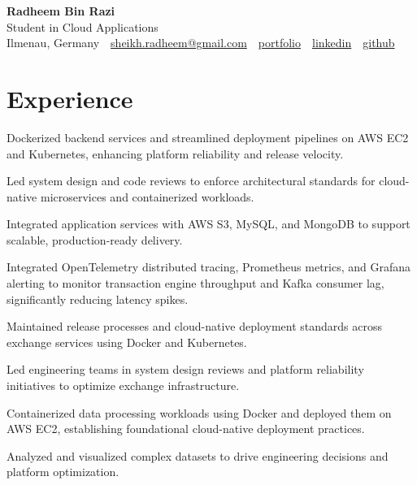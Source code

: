 \documentclass[10pt,a4paper]{resume}
\makeatletter
\newcommand{\Portfolio}{https://radheem.github.io/my-cv}
\newcommand{\PortfolioText}{portfolio}
\newcommand{\GitHub}{https://github.com/radheem}
\newcommand{\LinkedIn}{https://www.linkedin.com/in/radheem-razi}
\newcommand{\Email}{sheikh.radheem@gmail.com}
\makeatother
\begin{document}
\begin{center}
  {\huge\bfseries Radheem Bin Razi}\\[3pt]
  {\large Student in Cloud Applications}\\[6pt]
  \small
  Ilmenau, Germany \,\textbar\,
  \href{mailto:\Email}{\Email} \,\textbar\,
  \href{\Portfolio}{\PortfolioText} \,\textbar\,
  \href{\LinkedIn}{linkedin} \,\textbar\,
  \href{\GitHub}{github}
\end{center}
\vspace{2pt}

\section{Experience}

\bullets
  \item Dockerized backend services and streamlined deployment pipelines on AWS EC2 and Kubernetes, enhancing platform reliability and release velocity.
  \item Led system design and code reviews to enforce architectural standards for cloud-native microservices and containerized workloads.
  \item Integrated application services with AWS S3, MySQL, and MongoDB to support scalable, production-ready delivery.
\bulletsend
\vspace{1.5pt}
\bullets
  \item Integrated OpenTelemetry distributed tracing, Prometheus metrics, and Grafana alerting to monitor transaction engine throughput and Kafka consumer lag, significantly reducing latency spikes.
  \item Maintained release processes and cloud-native deployment standards across exchange services using Docker and Kubernetes.
  \item Led engineering teams in system design reviews and platform reliability initiatives to optimize exchange infrastructure.
\bulletsend
\vspace{1.5pt}
\bullets
  \item Containerized data processing workloads using Docker and deployed them on AWS EC2, establishing foundational cloud-native deployment practices.
  \item Analyzed and visualized complex datasets to drive engineering decisions and platform optimization.
\bulletsend
\vspace{1.5pt}
\end{document}
